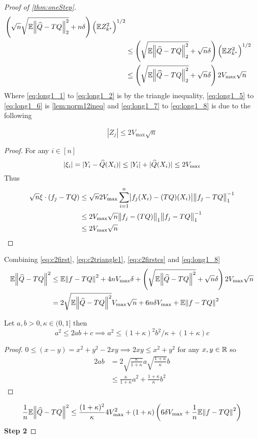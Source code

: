 \begin{proof}[Proof of \cref{thm:oneStep}]
\begin{align}
    \left(\sqrt{n} \sqrt{ \mathbb{E} \norm{\widehat{Q} -TQ}_2^2 } + n \delta \right) 
    \left( \mathbb{E} Z_{k^*}^2 \right)^{1/2} 
    \label{eq:long1_6}
    \\ &\leq \left(\sqrt{\mathbb{E} \norm{\widehat{Q} -TQ}_2^2} + \sqrt{n} \delta \right) 
    \left( \mathbb{E} Z_{k^*}^2 \right)^{1/2}
    \label{eq:long1_7}
    \\ &\leq \left(\sqrt{\mathbb{E} \norm{\widehat{Q} -TQ}_2^2} + \sqrt{n} \delta \right)
    2 V_{\max} \sqrt{n}
    \label{eq:long1_8}
  \end{align}
  Where \cref{eq:long1_1} to \cref{eq:long1_2} is by the triangle inequality,
  \cref{eq:long1_5} to \cref{eq:long1_6} is \cref{lem:norm12ineq}
  and \cref{eq:long1_7} to \cref{eq:long1_8} is due to the following
  \begin{prop}
    \[ |Z_j| \leq 2 V_{\max} \sqrt{n} \]
  \end{prop}
  \begin{proof} For any $i \in [n]$
    \[ |\xi_i| = |Y_i - \widehat{Q}(X_i)| \leq |Y_i| + |\widehat{Q}(X_i)|
    \leq 2 V_{\max} \]
    Thus
    \begin{align*}
      \sqrt{n} \xi \cdot (f_j - TQ)
      & \leq \sqrt{n} 2 V_{\max} \sum_{i=1}^n \abs{f_j(X_i) - (TQ)(X_i)}
      \norm{f_j - TQ}_1^{-1}
      \\ & \leq 2 V_{\max} \sqrt{n} \norm{f_j - (TQ)}_1
      \norm{f_j - TQ}_1^{-1}
      \\ & \leq 2 V_{\max} \sqrt{n}
    \end{align*}
  \end{proof}
  Combining \cref{eq:c2first}, \cref{eq:c2triangle1},
  \cref{eq:c2firstcs} and \cref{eq:long1_8}
  \begin{align}
    \mathbb{E} \norm{\widehat{Q} - TQ}^2 & \leq \mathbb{E} \norm{f - TQ}^2 + 4 n V_{\max} \delta
    + \left( \sqrt{\mathbb{E} \norm{\widehat{Q} - TQ}^2} + \sqrt{n} \delta \right)
    2 V_{\max} \sqrt{n}
    \\ & = 2 \sqrt{\mathbb{E} \norm{\widehat{Q} - TQ}^2} V_{\max} \sqrt{n}
    + 6 n \delta V_{\max} + \mathbb{E} \norm{f - TQ}^2
  \end{align}
  \begin{lem} Let $a,b>0, \kappa \in (0,1]$ then
    \[ a^2 \leq 2ab + c \implies a^2 \leq (1 + \kappa)^2 b^2 / \kappa
    + (1 + \kappa) c \]
  \end{lem}
  \begin{proof} $0 \leq (x - y) = x^2 + y^2 - 2xy \implies 2xy \leq x^2 + y^2$
    for any $x, y \in \mathbb{R}$ so
    \begin{align*}
      2ab & = 2 \sqrt{\frac{\kappa}{1+\kappa}} a \sqrt{\frac{1+\kappa}{\kappa}} b
      \\ & \leq \frac{\kappa}{1+\kappa} a^2 + \frac{1 + \kappa}{\kappa} b^2
    \end{align*}
  \end{proof}
  \begin{align}
    \frac{1}{n} \mathbb{E} \norm{\widehat{Q} - TQ}^2 \leq
    \frac{(1+\kappa)^2}{\kappa} 4 V_{\max}^2
    + (1 + \kappa) \left( 6 \delta V_{\max}
    + \frac{1}{n} \mathbb{E} \norm{f - TQ}^2 \right)
    \label{eq:c2step1final}
  \end{align}
  \textbf{Step 2}

\end{proof}



